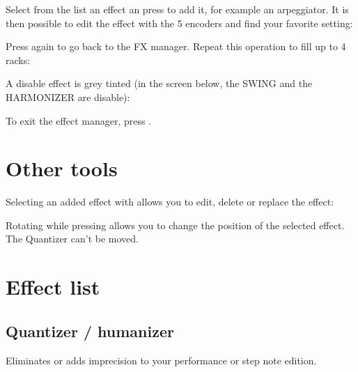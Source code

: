 Select from the list an effect an press \encodericon{} to add it, for example an arpeggiator. It is then possible to edit the effect with the 5 encoders \encodersicon{}  and find your favorite setting:



Press again \encodericon{} to go back to the FX manager. Repeat this operation to fill up to 4 racks:



A disable effect is grey tinted (in the screen below, the SWING and the HARMONIZER are disable):


To exit the effect manager, press .


\section{Other tools}

Selecting an added effect with \encodericon{} allows you to edit, delete or replace the effect:


Rotating \encodericon{} while pressing  allows you to change the position of the selected effect. The Quantizer can't be moved.



\section{Effect list}

\subsection{Quantizer / humanizer}

Eliminates or adds imprecision to your performance or step note edition.

